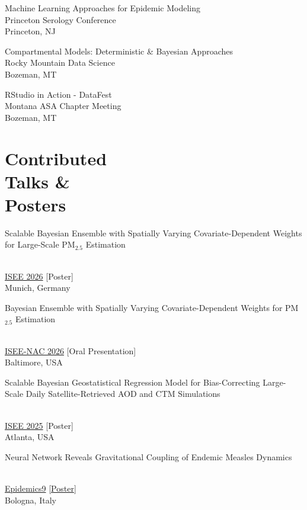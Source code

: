 \documentclass{wm_cv}
\begin{document}
Machine Learning Approaches for Epidemic Modeling\hfill {} \\
    \indent \quad Princeton Serology Conference  \\
   \indent \quad Princeton, NJ

Compartmental Models: Deterministic \& Bayesian Approaches \hfill {}\\ 
    \indent \quad Rocky Mountain Data Science  \\
   \indent \quad Bozeman, MT
   
RStudio in Action - DataFest \hfill {}\\ 
    \indent \quad Montana ASA Chapter Meeting  \\
   \indent \quad Bozeman, MT

   \section{Contributed \\ Talks \& \\ Posters}

\noindent\parbox[t]{0.75\textwidth}{\raggedright Scalable Bayesian Ensemble with Spatially Varying Covariate-Dependent Weights for Large-Scale PM$_{2.5}$ Estimation}\hfill {}\\
\indent \quad \href{https://www.isee26.org/}{ISEE 2026} [Poster] \\ 
   \indent \quad Munich, Germany \\

\noindent\parbox[t]{0.75\textwidth}{\raggedright Bayesian Ensemble with Spatially Varying Covariate-Dependent Weights for PM$_{2.5}$ Estimation}\hfill {}\\
\indent \quad \href{https://www.isee-northamerica.org/2026_nac_conference.php}{ISEE-NAC 2026} [Oral Presentation] \\ 
   \indent \quad Baltimore, USA \\

\noindent\parbox[t]{0.75\textwidth}{\raggedright Scalable Bayesian Geostatistical Regression Model for Bias-Correcting Large-Scale Daily Satellite-Retrieved AOD and CTM Simulations}\hfill {}\\
\indent \quad \href{https://www.isesisee2025.org/}{ISEE 2025} [Poster] \\ 
   \indent \quad Atlanta, USA \\

\noindent\parbox[t]{0.75\textwidth}{\raggedright Neural Network Reveals Gravitational Coupling of Endemic Measles Dynamics}\hfill {}\\
\indent \quad \href{https://www.elsevier.com/events/conferences/all/international-conference-on-infectious-disease-dynamics}{Epidemics9} [\href{https://www.wyattgmadden.com/files/posters/20231201epidemics/epidemics2023_poster.pdf}{Poster}] \\ 
   \indent \quad Bologna, Italy \\
\end{document}
